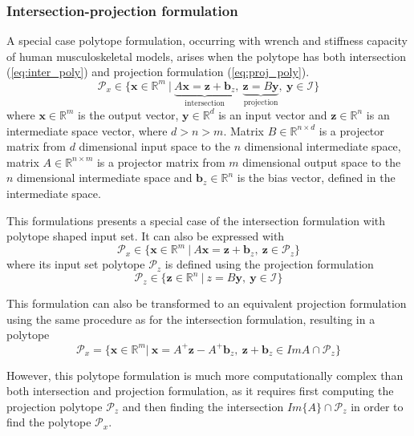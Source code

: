 \subsubsection{Intersection-projection formulation}
A special case polytope formulation, occurring with wrench and stiffness capacity of human musculoskeletal models, arises when the polytope has both intersection (\ref{eq:inter_poly}) and projection formulation (\ref{eq:proj_poly}). 
\begin{equation}
    \mathcal{P}_x \in \{\bm{x}\in \mathbb{R}^m~|~\underbrace{A \bm{x}= \bm{z}+ \bm{b}_z}_{\text{intersection}},~ \underbrace{ \bm{z}=B \bm{y}}_{\text{projection}} ,~ \bm{y} \in \mathcal{I}\} 
\end{equation}
where $\bm{x}\in\mathbb{R}^m$ is the output vector, $\bm{y} \in \mathbb{R}^d$ is an input vector and $\bm{z}\in\mathbb{R}^n$ is an intermediate space vector, where $d\!>\!n\!>\!m$. Matrix $B\in \mathbb{R}^{n \times d}$ is a projector matrix from $d$ dimensional input space to the $n$ dimensional intermediate space, matrix $A\in \mathbb{R}^{n\times m}$ is a projector matrix from $m$ dimensional output space to the $n$ dimensional intermediate space and $\bm{b}_z\in\mathbb{R}^n$ is the bias vector, defined in the intermediate space.

This formulations presents a special case of the intersection formulation with polytope shaped input set. It can also be expressed with
\begin{equation}
    \mathcal{P}_x \in \{\bm{x}\in \mathbb{R}^m~|~A \bm{x} = \bm{z} + \bm{b}_z,~ \bm{z} \in \mathcal{P}_z\} 
\end{equation}
where its input set polytope $\mathcal{P}_z$ is defined using the projection formulation
\begin{equation}
    \mathcal{P}_z \in \{\bm{z}\in \mathbb{R}^n~|~z = B\bm{y},~ \bm{y} \in \mathcal{I}\} 
\end{equation}

This formulation can also be transformed to an equivalent projection formulation using the same procedure as for the intersection formulation, resulting in a polytope 
\begin{equation}
\mathcal{P}_x=\{\bm{x} \in \mathbb{R}^m |~ \bm{x} = A^+\bm{z} - A^+\bm{b}_z,~ \bm{z}+\bm{b}_z \in Im{A}\cap\mathcal{P}_z\} 
\end{equation}

However, this polytope formulation is much more computationally complex than both intersection and projection formulation, as it requires first computing the projection polytope $\mathcal{P}_z$ and then finding the intersection $Im\{A\}\cap\mathcal{P}_z$ in order to find the polytope $\mathcal{P}_x$.


